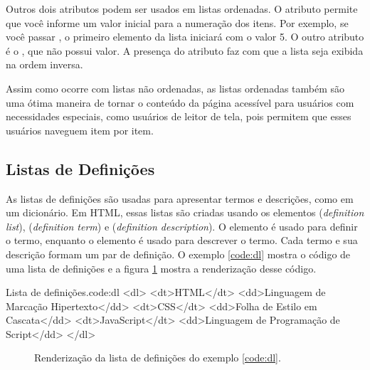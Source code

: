 Outros dois atributos podem ser usados em listas ordenadas. O atributo  permite que você informe um valor inicial para a numeração dos itens. Por exemplo, se você passar , o primeiro elemento da lista iniciará com o valor 5. O outro atributo é o , que não possui valor. A presença do atributo  faz com que a lista seja exibida na ordem inversa.

Assim como ocorre com listas não ordenadas, as listas ordenadas também são uma ótima maneira de tornar o conteúdo da página acessível para usuários com necessidades especiais, como usuários de leitor de tela, pois permitem que esses usuários naveguem item por item.

\subsection{Listas de Definições}

As listas de definições são usadas para apresentar termos e descrições, como em um dicionário. Em HTML, essas listas são criadas usando os elementos  (\textit{definition list}),  (\textit{definition term}) e  (\textit{definition description}). O elemento  é usado para definir o termo, enquanto o elemento  é usado para descrever o termo. Cada termo e sua descrição formam um par de definição. O exemplo \ref{code:dl} mostra o código de uma lista de definições e a figura \ref{fig:dl} mostra a renderização desse código.

\begin{htmlcode}{Lista de definições.}{code:dl}
<dl>
    <dt>HTML</dt>
    <dd>Linguagem de Marcação Hipertexto</dd>
    <dt>CSS</dt>
    <dd>Folha de Estilo em Cascata</dd>
    <dt>JavaScript</dt>
    <dd>Linguagem de Programação de Script</dd>
</dl>
\end{htmlcode}

\begin{figure}[ht!]    
    \caption{Renderização da lista de definições do exemplo \ref{code:dl}.}
    \label{fig:dl}
\end{figure}

